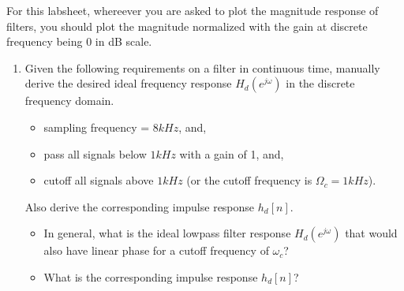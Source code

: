 \myhrule
For this labsheet, whereever you are asked to plot the magnitude response of filters, you should plot the magnitude normalized with the gain at discrete frequency being $0$ in dB scale.
\begin{enumerate}
\item Given the following requirements on a filter in continuous time, manually derive the desired ideal frequency response $H_{d}(e^{j\omega})$ in the discrete frequency domain.
  \begin{itemize}
  \item sampling frequency = $8 kHz$, and,
  \item pass all signals below $1 kHz$ with a gain of 1, and,
  \item cutoff all signals above $1 kHz$ (or the cutoff frequency is $\Omega_{c} = 1 kHz$).
  \end{itemize}
  Also derive the corresponding impulse response $h_{d}[n]$.
  \begin{itemize}
  \item In general, what is the ideal lowpass filter response $H_{d}(e^{j\omega})$ that would also have linear phase for a cutoff frequency of $\omega_{c}$?
  \item What is the corresponding impulse response $h_{d}[n]$?
  \end{itemize}


\end{enumerate}
